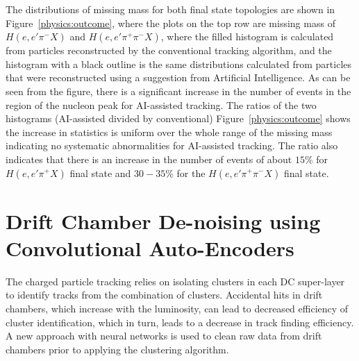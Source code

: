 \documentclass{webofc}
\begin{document}
The distributions of missing mass for both final state topologies are shown in Figure~\ref{physics:outcome}, where the plots 
on the top row are missing mass of $H(e,e'\pi^-X)$ and $H(e,e'\pi^+\pi^-X)$, where the filled histogram is calculated from 
particles reconstructed by the conventional tracking algorithm, and the histogram with a black outline is the same distributions 
calculated from particles that were reconstructed using a suggestion from Artificial Intelligence. As can be seen from the figure, 
there is a significant increase in the number of events in the region of the nucleon peak for AI-assisted
tracking. The ratios of the two histograms (AI-assisted divided by conventional)
Figure~\ref{physics:outcome} shows the increase in statistics is uniform over the whole range of the 
missing mass indicating no systematic abnormalities for AI-assisted tracking. The ratio also indicates that there is an increase 
in the number of events of about $15\%$ for $H(e,e'\pi^+X)$ final state and $30-35\%$ for the $H(e,e'\pi^+\pi^-X)$
final state. 

\section{Drift Chamber De-noising using Convolutional Auto-Encoders}
\label{dc-denoising}

The charged particle tracking relies on isolating clusters in each DC super-layer to identify tracks from the combination of clusters.
Accidental hits in drift chambers, which increase with the luminosity, can lead to decreased efficiency of cluster identification, which 
in turn, leads to a decrease in track finding efficiency. A new approach with neural networks is used to clean raw data from drift chambers 
prior to applying the clustering algorithm. 
\end{document}
